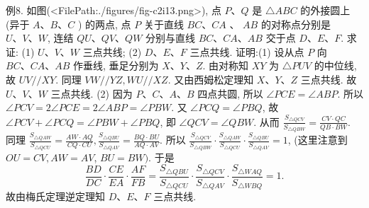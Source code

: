 例8. 如图(<FilePath:./figures/fig-c2i13.png>), 点 $P 、 Q$ 是 $\triangle A B C$ 的外接圆上(异于 $A 、 B 、 C$ ) 的两点, 点 $P$ 关于直线 $B C 、 C A$ 、 $A B$ 的对称点分别是 $U 、 V 、 W$, 连结 $Q U 、 Q V 、 Q W$ 分别与直线 $B C 、 C A 、 A B$ 交于点 $D 、 E 、 F$.
求证: (1) $U 、 V 、 W$ 三点共线;
(2) $D 、 E 、 F$ 三点共线.
证明:(1) 设从点 $P$ 向 $B C 、 C A 、 A B$ 作垂线, 垂足分别为 $X 、 Y 、 Z$.
由对称知 $X Y$ 为 $\triangle P U V$ 的中位线, 故 $U V / / X Y$.
同理 $V W / / Y Z, W U / / X Z$.
又由西姆松定理知 $X 、 Y 、 Z$ 三点共线.
故 $U 、 V 、 W$ 三点共线.
(2) 因为 $P 、 C 、 A 、 B$ 四点共圆, 所以 $\angle P C E=\angle A B P$.
所以 $\angle P C V=2 \angle P C E=2 \angle A B P=\angle P B W$.
又 $\angle P C Q=\angle P B Q$, 故 $\angle P C V+\angle P C Q=\angle P B W+\angle P B Q$, 即 $\angle Q C V=\angle Q B W$.
从而 $\frac{S_{\triangle Q C V}}{S_{\triangle Q B W}}=\frac{C V \cdot Q C}{Q B \cdot B W}$.
同理 $\frac{S_{\triangle Q A W}}{S_{\triangle Q C U}}=\frac{A W \cdot A Q}{C Q \cdot C U}, \frac{S_{\triangle Q B U}}{S_{\triangle Q A V}}=\frac{B Q \cdot B U}{A Q \cdot A V}$.
所以 $\frac{S_{\triangle Q C V}}{S_{\triangle Q B W}} \cdot \frac{S_{\triangle Q A W}}{S_{\triangle Q C U}} \cdot \frac{S_{\triangle Q B U}}{S_{\triangle Q A V}}=1$, (这里注意到 $O U=C V, A W=A V$, $B U=B W)$. 于是
$$
\frac{B D}{D C} \cdot \frac{C E}{E A} \cdot \frac{A F}{F B}=\frac{S_{\triangle Q B U}}{S_{\triangle Q C U}} \cdot \frac{S_{\triangle Q C V}}{S_{\triangle Q A V}} \cdot \frac{S_{\triangle W A Q}}{S_{\triangle W B Q}}=1 .
$$
故由梅氏定理逆定理知 $D 、 E 、 F$ 三点共线.



